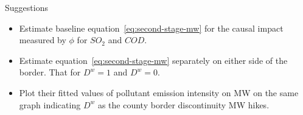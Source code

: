 \documentclass[aspectratio = 169]{beamer}
\begin{document}
    \begin{frame}{Suggestions}
        \begin{itemize}
            \item Estimate baseline equation~\ref{eq:second-stage-mw} for the causal impact measured by $\phi$ for $SO_{2}$ and $COD$.
            \item Estimate equation~\ref{eq:second-stage-mw} separately on either side of the border. That for $D^{w} = 1$ and $D^{w} = 0$.
            \item Plot their fitted values of pollutant emission intensity on MW on the same graph indicating $D^{w}$ as the county border discontinuity MW hikes.
        \end{itemize}
    \end{frame}


    \begin{frame}
        \printbibliography
    \end{frame}
\end{document}
